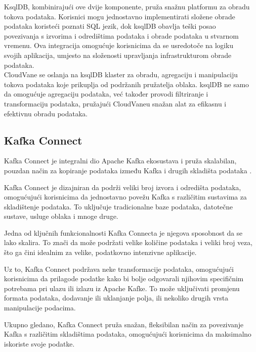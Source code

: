 \documentclass[times, utf8, diplomski]{fer}
\begin{document}
KsqlDB, kombinirajući ove dvije komponente, pruža snažnu platformu za obradu tokova podataka. Korisnici mogu jednostavno implementirati složene obrade podataka koristeći poznati SQL jezik, dok ksqlDB obavlja teški posao povezivanja s izvorima i odredištima podataka i obrade podataka u stvarnom vremenu. Ova integracija omogućuje korisnicima da se usredotoče na logiku svojih aplikacija, umjesto na složenosti upravljanja infrastrukturom obrade podataka. \\

CloudVane se oslanja na ksqlDB klaster za obradu, agregaciju i manipulaciju tokova podataka koje prikuplja od podržanih pružatelja oblaka. ksqlDB ne samo da omogućuje agregaciju podataka, već također provodi filtriranje i transformaciju podataka, pružajući CloudVaneu snažan alat za efikasnu i efektivnu obradu podataka.

\clearpage
\subsection{Kafka Connect}
\label{sec:connect}

Kafka Connect je integralni dio Apache Kafka ekosustava i pruža skalabilan, pouzdan način za kopiranje podataka između Kafka i drugih skladišta podataka \citep{shapira_kafka_2021}.

Kafka Connect je dizajniran da podrži veliki broj izvora  i odredišta  podataka, omogućujući korisnicima da jednostavno povežu Kafka s različitim sustavima za skladištenje podataka. To uključuje tradicionalne baze podataka, datotečne sustave, usluge oblaka i mnoge druge.

Jedna od ključnih funkcionalnosti Kafka Connecta je njegova sposobnost da se lako skalira. To znači da može podržati velike količine podataka i veliki broj veza, što ga čini idealnim za velike, podatkovno intenzivne aplikacije.

Uz to, Kafka Connect podržava neke transformacije podataka, omogućujući korisnicima da prilagode podatke kako bi bolje odgovarali njihovim specifičnim potrebama pri ulazu ili izlazu iz Apache Kafke. To može uključivati promjenu formata podataka, dodavanje ili uklanjanje polja, ili nekoliko drugih vrsta manipulacije podacima.

Ukupno gledano, Kafka Connect pruža snažan, fleksibilan način za povezivanje Kafka s različitim skladištima podataka, omogućujući korisnicima da maksimalno iskoriste svoje podatke. \\
\end{document}
